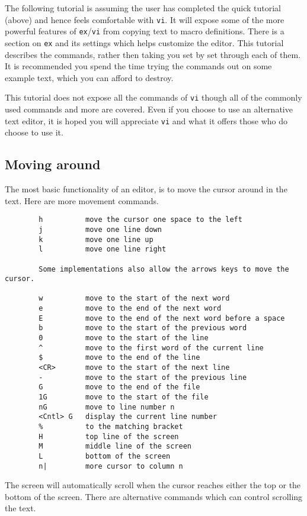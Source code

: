 The following tutorial is assuming the user has completed the quick
tutorial (above) and hence feels comfortable with {\tt vi}. It will
expose some of the more powerful features of {\tt ex}/{\tt vi} from
copying text to macro definitions.  There is a section on {\tt ex} and
its settings which helps customize the editor. This tutorial describes
the commands, rather then taking you set by set through each of them.
It is recommended you spend the time trying the commands out on some
example text, which you can afford to destroy.

This tutorial does not expose all the commands of {\tt vi} though all of the
commonly used commands and more are covered. Even if you choose to use
an alternative text editor, it is hoped you will appreciate {\tt vi} and
what it offers those who do choose to use it.

\subsection{Moving around}
The most basic functionality of an editor, is to move the cursor around in the text.
Here are more movement commands.
\begin{verbatim}
        h          move the cursor one space to the left
        j          move one line down
        k          move one line up
        l          move one line right

        Some implementations also allow the arrows keys to move the cursor.

        w          move to the start of the next word
        e          move to the end of the next word
        E          move to the end of the next word before a space
        b          move to the start of the previous word
        0          move to the start of the line
        ^          move to the first word of the current line
        $          move to the end of the line
        <CR>       move to the start of the next line
        -          move to the start of the previous line
        G          move to the end of the file
        1G         move to the start of the file
        nG         move to line number n
        <Cntl> G   display the current line number
        %          to the matching bracket
        H          top line of the screen
        M          middle line of the screen
        L          bottom of the screen
        n|         more cursor to column n
\end{verbatim}

The screen will automatically scroll when the cursor reaches either the top
or the bottom of the screen. There are alternative commands which can control
scrolling the text.

